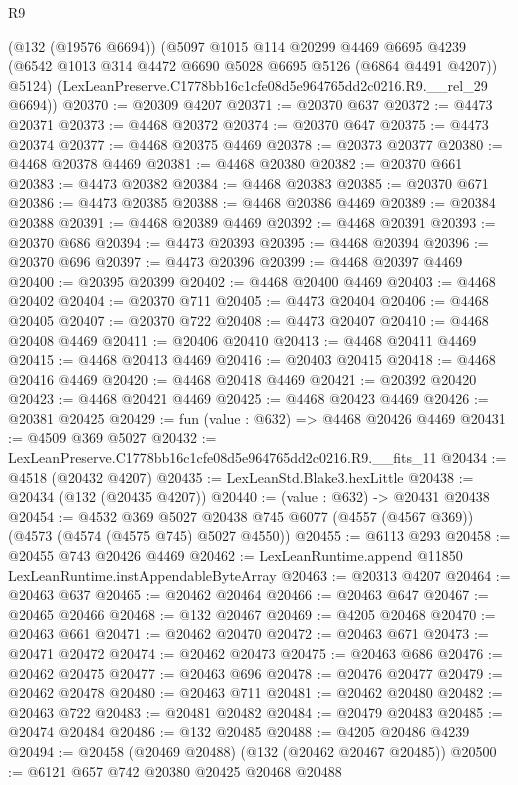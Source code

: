 \begin{lexlean}{R9}
\begin{coremodule}
      (@132 (@19576 @6694))
      (@5097
        @1015
        @114
        @20299
        @4469
        @6695
        @4239
        (@6542 @1013 @314 @4472 @6690 @5028 @6695 @5126 (@6864 @4491 @4207))
        @5124)
      (LexLeanPreserve.C1778bb16c1cfe08d5e964765dd2c0216.R9.__rel_29 @6694))
@20370 := @20309 @4207
@20371 := @20370 @637
@20372 := @4473 @20371
@20373 := @4468 @20372
@20374 := @20370 @647
@20375 := @4473 @20374
@20377 := @4468 @20375 @4469
@20378 := @20373 @20377
@20380 := @4468 @20378 @4469
@20381 := @4468 @20380
@20382 := @20370 @661
@20383 := @4473 @20382
@20384 := @4468 @20383
@20385 := @20370 @671
@20386 := @4473 @20385
@20388 := @4468 @20386 @4469
@20389 := @20384 @20388
@20391 := @4468 @20389 @4469
@20392 := @4468 @20391
@20393 := @20370 @686
@20394 := @4473 @20393
@20395 := @4468 @20394
@20396 := @20370 @696
@20397 := @4473 @20396
@20399 := @4468 @20397 @4469
@20400 := @20395 @20399
@20402 := @4468 @20400 @4469
@20403 := @4468 @20402
@20404 := @20370 @711
@20405 := @4473 @20404
@20406 := @4468 @20405
@20407 := @20370 @722
@20408 := @4473 @20407
@20410 := @4468 @20408 @4469
@20411 := @20406 @20410
@20413 := @4468 @20411 @4469
@20415 := @4468 @20413 @4469
@20416 := @20403 @20415
@20418 := @4468 @20416 @4469
@20420 := @4468 @20418 @4469
@20421 := @20392 @20420
@20423 := @4468 @20421 @4469
@20425 := @4468 @20423 @4469
@20426 := @20381 @20425
@20429 := fun (value : @632) => @4468 @20426 @4469
@20431 := @4509 @369 @5027
@20432 := LexLeanPreserve.C1778bb16c1cfe08d5e964765dd2c0216.R9.__fits_11
@20434 := @4518 (@20432 @4207)
@20435 := LexLeanStd.Blake3.hexLittle
@20438 := @20434 (@132 (@20435 @4207))
@20440 := (value : @632) -> @20431 @20438
@20454 := @4532
    @369
    @5027
    @20438
    @745
    @6077
    (@4557 (@4567 @369))
    (@4573 (@4574 (@4575 @745) @5027 @4550))
@20455 := @6113 @293
@20458 := @20455 @743 @20426 @4469
@20462 := LexLeanRuntime.append @11850 LexLeanRuntime.instAppendableByteArray
@20463 := @20313 @4207
@20464 := @20463 @637
@20465 := @20462 @20464
@20466 := @20463 @647
@20467 := @20465 @20466
@20468 := @132 @20467
@20469 := @4205 @20468
@20470 := @20463 @661
@20471 := @20462 @20470
@20472 := @20463 @671
@20473 := @20471 @20472
@20474 := @20462 @20473
@20475 := @20463 @686
@20476 := @20462 @20475
@20477 := @20463 @696
@20478 := @20476 @20477
@20479 := @20462 @20478
@20480 := @20463 @711
@20481 := @20462 @20480
@20482 := @20463 @722
@20483 := @20481 @20482
@20484 := @20479 @20483
@20485 := @20474 @20484
@20486 := @132 @20485
@20488 := @4205 @20486 @4239
@20494 := @20458 (@20469 @20488) (@132 (@20462 @20467 @20485))
@20500 := @6121 @657 @742 @20380 @20425 @20468 @20488

\end{coremodule}
\end{lexlean}
